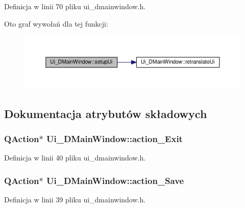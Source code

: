 Definicja w linii 70 pliku ui\-\_\-dmainwindow.\-h.



Oto graf wywołań dla tej funkcji\-:\nopagebreak
\begin{figure}[H]
\begin{center}
\leavevmode
\includegraphics[width=350pt]{class_ui___d_main_window_aa53f3a89bf520704a3e79037df2fd451_cgraph}
\end{center}
\end{figure}




\subsection{Dokumentacja atrybutów składowych}
\hypertarget{class_ui___d_main_window_a00e6b795743b676bdf3ed853e91f7029}{
\subsubsection[{action\-\_\-\-Exit}]{\setlength{\rightskip}{0pt plus 5cm}Q\-Action$\ast$ Ui\-\_\-\-D\-Main\-Window\-::action\-\_\-\-Exit}}\label{class_ui___d_main_window_a00e6b795743b676bdf3ed853e91f7029}


Definicja w linii 40 pliku ui\-\_\-dmainwindow.\-h.

\hypertarget{class_ui___d_main_window_a7ab98279e07bdd724a091ea06012c87b}{
\subsubsection[{action\-\_\-\-Save}]{\setlength{\rightskip}{0pt plus 5cm}Q\-Action$\ast$ Ui\-\_\-\-D\-Main\-Window\-::action\-\_\-\-Save}}\label{class_ui___d_main_window_a7ab98279e07bdd724a091ea06012c87b}


Definicja w linii 39 pliku ui\-\_\-dmainwindow.\-h.

